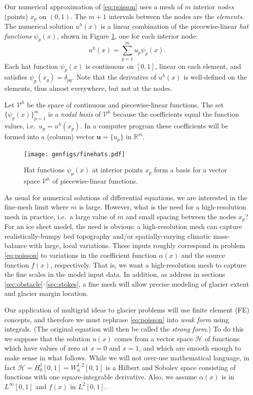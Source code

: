 \documentclass[letterpaper,final,12pt,reqno]{amsart}
\theoremstyle{claim}
\newcommand{\RR}{\mathbb{R}}
\newcommand{\bu}{\mathbf{u}}
\numberwithin{equation}{section}
\numberwithin{figure}{section}
\numberwithin{table}{section}
\numberwithin{theorem}{section}
\begin{document}
Our numerical approximation of \eqref{eq:poisson} uses a mesh of $m$ interior \emph{nodes} (points) $x_p$ on $(0,1)$.  The $m+1$ intervals between the nodes are the \emph{elements}.  The numerical solution $u^h(x)$ is a linear combination of the piecewise-linear \emph{hat functions} $\psi_p(x)$, shown in Figure \ref{fig:finehats}, one for each interior node:
\begin{equation}
u^h(x) = \sum_{p=1}^m u_p \psi_p(x). \label{eq:trialsolution}
\end{equation}
Each hat function $\psi_p(x)$ is continuous on $[0,1]$, linear on each element, and satisfies $\psi_p(x_q) = \delta_{pq}$.  Note that the derivative of $u^h(x)$ is well-defined on the elements, thus almost everywhere, but not at the nodes.

Let $\mathcal{V}^h$ be the space of continuous and piecewise-linear functions.  The set $\{\psi_p(x)\}_{p=1}^m$ is a \emph{nodal basis} of $\mathcal{V}^h$ because the coefficients equal the function values, i.e.~$u_p=u^h(x_p)$.  In a computer program these coefficients will be formed into a (column) vector $\bu=\{u_p\}$ in $\RR^m$.

\begin{figure}
\texttt{[image: genfigs/finehats.pdf]}
\caption{Hat functions $\psi_p(x)$ at interior points $x_p$ form a basis for a vector space $\mathcal{V}^h$ of piecewise-linear functions.}
\label{fig:finehats}
\end{figure}

As usual for numerical solutions of differential equations, we are interested in the fine-mesh limit where $m$ is large.  However, what is the need for a high-resolution mesh in practice, i.e.~a large value of $m$ and small spacing between the nodes $x_p$?  For an ice sheet model, the need is obvious: a high-resolution mesh can capture realistically-bumpy bed topography and/or spatially-varying climatic mass-balance with large, local variations.  These inputs roughly correspond in problem \eqref{eq:poisson} to variations in the coefficient function $\alpha(x)$ and the source function $f(x)$, respectively.  That is, we want a high-resolution mesh to capture the fine scales in the model input data.  In addition, as address in sections \ref{sec:obstacle}--\ref{sec:stokes}, a fine mesh will allow precise modeling of glacier extent and glacier margin location.

Our application of multigrid ideas to glacier problems will use finite element (FE) concepts, and therefore we must rephrase \eqref{eq:poisson} into \emph{weak form} using integrals.  (The original equation will then be called the \emph{strong form}.)  To do this we suppose that the solution $u(x)$ comes from a vector space $\mathcal{H}$ of functions which have values of zero at $x=0$ and $x=1$, and which are smooth enough to make sense in what follows.  While we will not over-use mathematical language, in fact $\mathcal{H}=H_0^1[0,1]=W_0^{1,2}[0,1]$ is a Hilbert and Sobolev space \cite[for example]{Evans2010} consisting of functions with one square-integrable derivative.  Also, we assume $\alpha(x)$ is in $L^\infty[0,1]$ and $f(x)$ in $L^2[0,1]$.
\end{document}
